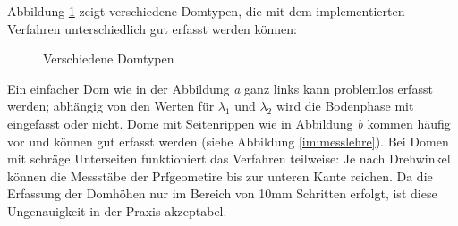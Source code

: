 Abbildung \ref{im:domes} zeigt verschiedene Domtypen, die mit dem implementierten Verfahren unterschiedlich gut erfasst werden k\"onnen:

\begin{figure}[ht]
    \centering 
\caption{Verschiedene Domtypen} 
\label{im:domes}
\end{figure} 

Ein einfacher Dom wie in der Abbildung \textit{a} ganz links kann problemlos erfasst werden; abh\"angig von den Werten f\"ur $\lambda_{1}$ und $\lambda_{2}$ wird die Bodenphase mit eingefasst oder nicht. Dome mit Seitenrippen wie in Abbildung \textit{b} kommen h\"aufig vor und k\"onnen gut erfasst werden (siehe Abbildung \ref{im:messlehre}). Bei Domen mit schr\"age Unterseiten funktioniert das Verfahren teilweise: Je nach Drehwinkel k\"onnen die Messst\"abe der Pr\"fgeometire bis zur unteren Kante reichen. Da die Erfassung der Domh\"ohen nur im Bereich von 10mm Schritten erfolgt, ist diese Ungenauigkeit in der Praxis akzeptabel. 

